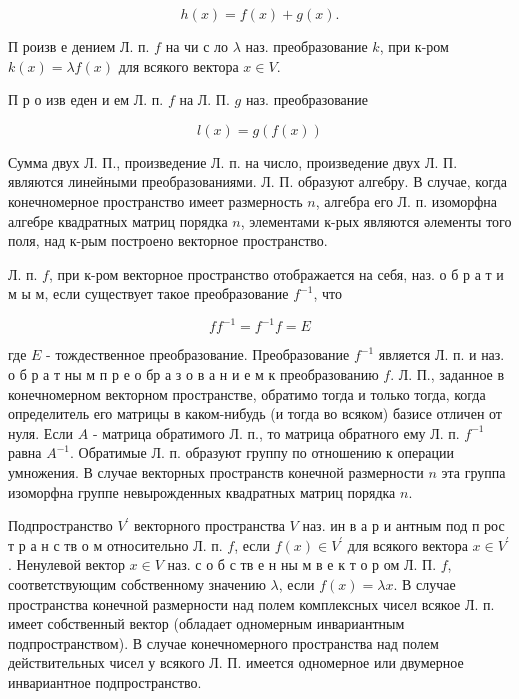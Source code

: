 \documentclass[10pt]{article}
\begin{document}
\[

h(x)=f(x)+g(x) .

\]



П роизв е дением Л. п. $f$ на чи с ло $\lambda$ наз. преобразование $k$, при к-ром $k(x)=\lambda f(x)$ для всякого вектора $x \in V$.



П р о изв еден и ем Л. п. $f$ на Л. П. $g$ наз. преобразование



\[

l(x)=g(f(x))

\]



Сумма двух Л. П., произведение Л. п. на число, произведение двух Л. П. являются линейными преобразованиями. Л. П. образуют алгебру. В случае, когда конечномерное пространство имеет размерность $n$, алгебра его Л. п. изоморфна алгебре квадратных матриц порядка $n$, элементами к-рых являются әлементы того поля, над к-рым построено векторное пространство.



Л. п. $f$, при к-ром векторное пространство отображается на себя, наз. о б р а т и м ы м, если существует такое преобразование $f^{-1}$, что



\[

f f^{-1}=f^{-1} f=E

\]



где $E$ - тождественное преобразование. Преобразование $f^{-1}$ является Л. п. и наз. о б р а т ны м п р е о бр а з о в а н и е м к преобразованию $f$. Л. П., заданное в конечномерном векторном пространстве, обратимо тогда и только тогда, когда определитель его матрицы в каком-нибудь (и тогда во всяком) базисе отличен от нуля. Если $A$ - матрица обратимого Л. п., то матрица обратного ему Л. п. $f^{-1}$ равна $A^{-1}$. Обратимые Л. п. образуют группу по отношению к операции умножения. В случае векторных пространств конечной размерности $n$ эта группа изоморфна группе невырожденных квадратных матриц порядка $n$.



Подпространство $V^{\prime}$ векторного пространства $V$ наз. ин в а р и антным под п рос т р а н с тв о м относительно Л. п. $f$, если $f(x) \in V^{\prime}$ для всякого вектора $x \in V^{\prime}$. Ненулевой вектор $x \in V$ наз. с о б с тв е н ны м в е к т о р ом Л. П. $f$, соответствующим собственному значению $\lambda$, если $f(x)=\lambda x$. В случае пространства конечной размерности над полем комплексных чисел всякое Л. п. имеет собственный вектор (обладает одномерным инвариантным подпространством). В случае конечномерного пространства над полем действительных чисел у всякого Л. П. имеется одномерное или двумерное инвариантное подпространство.
\end{document}
